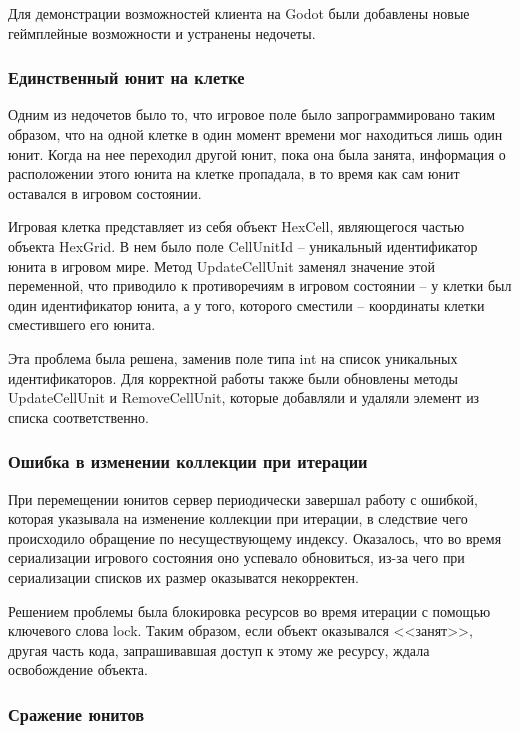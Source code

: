         Для демонстрации возможностей клиента на Godot были добавлены новые геймплейные возможности и устранены недочеты.

        \subsubsection{Единственный юнит на клетке}
        Одним из недочетов было то, что игровое поле было запрограммировано таким образом, что на одной клетке в один момент времени мог находиться лишь 
        один юнит. Когда на нее переходил другой юнит, пока она была занята, информация о расположении этого юнита на клетке пропадала, в то время как сам 
        юнит оставался в игровом состоянии.

        Игровая клетка представляет из себя объект HexCell, являющегося частью объекта HexGrid. В нем было поле CellUnitId -- уникальный идентификатор юнита в 
        игровом мире. Метод UpdateCellUnit заменял значение этой переменной, что приводило к противоречиям в игровом состоянии -- у клетки был один идентификатор
        юнита, а у того, которого сместили -- координаты клетки сместившего его юнита.

        Эта проблема была решена, заменив поле типа int на список уникальных идентификаторов. Для корректной работы также были обновлены методы UpdateCellUnit и
        RemoveCellUnit, которые добавляли и удаляли элемент из списка соответственно.

        \subsubsection{Ошибка в изменении коллекции при итерации}

        При перемещении юнитов сервер периодически завершал работу с ошибкой, которая указывала на изменение коллекции при итерации, в следствие чего 
        происходило обращение по несуществующему индексу. Оказалось, что во время сериализации игрового состояния оно успевало обновиться, из-за чего
        при сериализации списков их размер оказыватся некорректен.

        Решением проблемы была блокировка ресурсов во время итерации с помощью ключевого слова lock. Таким образом, если объект оказывался <<занят>>, 
        другая часть кода, запрашивавшая доступ к этому же ресурсу, ждала освобождение объекта.

        \subsubsection{Сражение юнитов}


